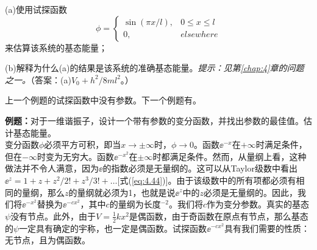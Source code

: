 \begin{examplebox}
        (a)使用试探函数
        \begin{equation*}
            \phi = \begin{cases}
                \sin\left(\pi x/l\right), & 0 \leq x \leq l \\
                0, & elsewhere
            \end{cases}
        \end{equation*}
        来估算该系统的基态能量；

        (b)解释为什么(a)的结果是该系统的准确基态能量。\textit{提示：见第\ref{chap:4}章的问题之一。}（答案：(a)$V_0 + h^2/8ml^2$。）
    \end{examplebox}

    上一个例题的试探函数中没有参数。下一个例题有。

    \begin{examplebox}
        \textbf{例题：}对于一维谐振子，设计一个带有参数的变分函数，并找出参数的最佳值。估计基态能量。
        \\

        变分函数$\phi$必须平方可积，即当$x \to \pm \infty$时，$\phi \to 0$。函数$\ee ^{-x}$在$+ \infty$时满足条件，但在$-\infty$时变为无穷大。函数$\ee ^{-x^2}$在$\pm \infty$时都满足条件。然而，从量纲上看，这种做法并不令人满意，因为$\ee $的指数必须是无量纲的。这可以从Taylor级数中看出$\ee ^z = 1 + z + z^2/2! + z^3/3! + \ldots$[式(\ref{eq:4.44})]。由于该级数中的所有项都必须有相同的量纲，那么$z$的量纲就必须为1，也就是说$\ee ^z$中的$z$必须是无量纲的。因此，我们将$\ee ^{-x^2}$替换为$\ee ^{-cx^2}$，其中$c$的量纲为长度$^{-2}$。我们将$c$作为变分参数。真实的基态$\psi$没有节点。此外，由于$V = \frac{1}{2}kx^2$是偶函数，由于奇函数在原点有节点，那么基态的$\psi$一定具有确定的宇称，也一定是偶函数。试探函数$\ee ^{-cx^2}$具有我们需要的性质：无节点，且为偶函数。


\end{examplebox}
